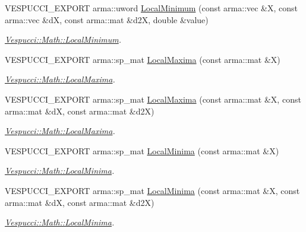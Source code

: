 \begin{DoxyCompactItemize}
\item 
V\+E\+S\+P\+U\+C\+C\+I\+\_\+\+E\+X\+P\+O\+RT arma\+::uword \hyperlink{namespace_vespucci_1_1_math_a4beeb66c2cdfee0e32deca2281f79aa7}{Local\+Minimum} (const arma\+::vec \&X, const arma\+::vec \&dX, const arma\+::mat \&d2X, double \&value)
\begin{DoxyCompactList}\small\item\em \hyperlink{namespace_vespucci_1_1_math_ad2cb6ff82f9df5c6779f4c2b16ca5c53}{Vespucci\+::\+Math\+::\+Local\+Minimum}. \end{DoxyCompactList}\item 
V\+E\+S\+P\+U\+C\+C\+I\+\_\+\+E\+X\+P\+O\+RT arma\+::sp\+\_\+mat \hyperlink{namespace_vespucci_1_1_math_a0ae415aafa638d49a2ee5b2816bdf7ec}{Local\+Maxima} (const arma\+::mat \&X)
\begin{DoxyCompactList}\small\item\em \hyperlink{namespace_vespucci_1_1_math_a0ae415aafa638d49a2ee5b2816bdf7ec}{Vespucci\+::\+Math\+::\+Local\+Maxima}. \end{DoxyCompactList}\item 
V\+E\+S\+P\+U\+C\+C\+I\+\_\+\+E\+X\+P\+O\+RT arma\+::sp\+\_\+mat \hyperlink{namespace_vespucci_1_1_math_ae5214109e423583abf4dfa8c71223343}{Local\+Maxima} (const arma\+::mat \&X, const arma\+::mat \&dX, const arma\+::mat \&d2X)
\begin{DoxyCompactList}\small\item\em \hyperlink{namespace_vespucci_1_1_math_a0ae415aafa638d49a2ee5b2816bdf7ec}{Vespucci\+::\+Math\+::\+Local\+Maxima}. \end{DoxyCompactList}\item 
V\+E\+S\+P\+U\+C\+C\+I\+\_\+\+E\+X\+P\+O\+RT arma\+::sp\+\_\+mat \hyperlink{namespace_vespucci_1_1_math_a72d209bf07859fa53f1f6aadf1d0a37b}{Local\+Minima} (const arma\+::mat \&X)
\begin{DoxyCompactList}\small\item\em \hyperlink{namespace_vespucci_1_1_math_a72d209bf07859fa53f1f6aadf1d0a37b}{Vespucci\+::\+Math\+::\+Local\+Minima}. \end{DoxyCompactList}\item 
V\+E\+S\+P\+U\+C\+C\+I\+\_\+\+E\+X\+P\+O\+RT arma\+::sp\+\_\+mat \hyperlink{namespace_vespucci_1_1_math_ab06ee701a990bd32f2a635a85b8ea169}{Local\+Minima} (const arma\+::mat \&X, const arma\+::mat \&dX, const arma\+::mat \&d2X)
\begin{DoxyCompactList}\small\item\em \hyperlink{namespace_vespucci_1_1_math_a72d209bf07859fa53f1f6aadf1d0a37b}{Vespucci\+::\+Math\+::\+Local\+Minima}. \end{DoxyCompactList}\item 

\end{DoxyCompactItemize}

